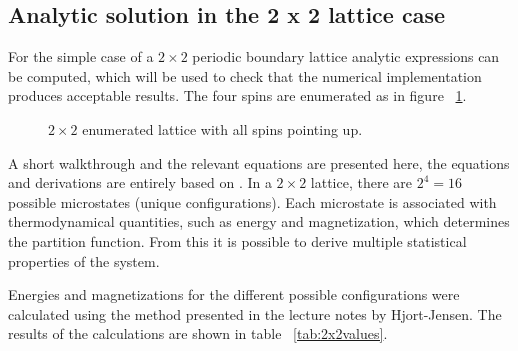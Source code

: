 \documentclass[aps,reprint]{revtex4-1}
\begin{document}
\subsection{Analytic solution in the 2 x 2 lattice case}
For the simple case of a $2 \times 2$ periodic boundary lattice analytic
expressions can be computed, which will be used to check that the numerical
implementation produces acceptable results. The four spins are enumerated as in
figure ~\ref{fig:22lattice}.
\begin{figure}[H]
  \centering
  \caption{$2 \times 2$ enumerated lattice with all spins pointing up.}
  \label{fig:22lattice}
\end{figure}
A short walkthrough and the relevant equations are presented here, the equations
and derivations are entirely based on \cite{mortenjensen}. In a $2 \times 2$
lattice, there are $2^4 = 16$ possible microstates (unique configurations). Each
microstate is associated with thermodynamical quantities, such as energy and
magnetization, which determines the partition function. From this it is possible
to derive multiple statistical properties of the system.

Energies and magnetizations for the different possible configurations were calculated
using the method presented in the lecture notes by Hjort-Jensen.
The results of the calculations are shown in table ~\ref{tab:2x2values}.
\end{document}
